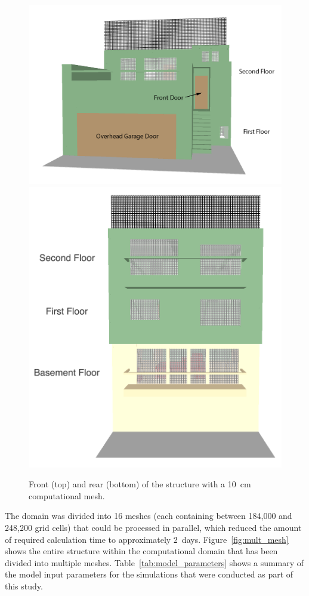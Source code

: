 \documentclass[12pt,oneside]{book}
\begin{document}
\begin{figure}[!ht]
\includegraphics[width=5.0in]{../Figures/SMV_Exterior_Grid_Front} \\
\includegraphics[width=4.5in]{../Figures/SMV_Exterior_Grid_Rear}
\caption{Front (top) and rear (bottom) of the structure with a 10~cm computational mesh.}
\label{fig:SMV_exterior_grid}
\end{figure}


\clearpage


The domain was divided into 16 meshes (each containing between 184,000 and 248,200 grid cells) that could be processed in parallel, which reduced the amount of required calculation time to approximately 2~days. Figure~\ref{fig:mult_mesh} shows the entire structure within the computational domain that has been divided into multiple meshes. Table~\ref{tab:model_parameters} shows a summary of the model input parameters for the simulations that were conducted as part of this study.
\end{document}
